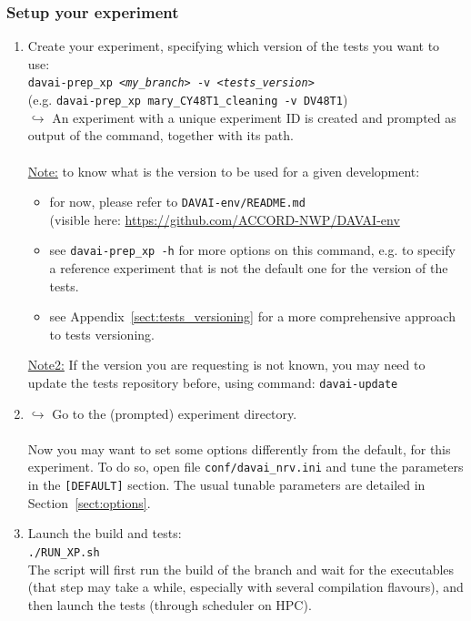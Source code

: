 \documentclass[a4paper,10pt,twoside]{article}
\begin{document}
\subsubsection{Setup your experiment}
\begin{enumerate}[label=(\alph*)]
 \item Create your experiment, specifying which version of the tests you want to use:\\
 \texttt{davai-prep\_xp \textit{<my\_branch>} -v \textit{<tests\_version>}}\\
 (e.g. \texttt{davai-prep\_xp mary\_CY48T1\_cleaning -v DV48T1})\\
 $\hookrightarrow$ An experiment with a unique experiment ID is created and prompted as output of the command, together with its path.\\
 \\
 \underline{Note:} to know what is the version to be used for a given development:
 \begin{itemize}
  \item for now, please refer to \texttt{DAVAI-env/README.md}\\
        (visible here: \href{https://github.com/ACCORD-NWP/DAVAI-env}{https://github.com/ACCORD-NWP/DAVAI-env}
  \item see \texttt{davai-prep\_xp -h} for more options on this command, e.g. to specify a reference experiment that is not the default one for the version of the tests.
  \item see Appendix~\ref{sect:tests_versioning} for a more comprehensive approach to tests versioning.
 \end{itemize}
 \underline{Note2:} If the version you are requesting is not known, you may need to update the tests repository before, using command: \texttt{davai-update}
 \item $\hookrightarrow$ Go to the (prompted) experiment directory.\\
 \\
 Now you may want to set some options differently from the default, for this experiment. To do so, open file \texttt{conf/davai\_nrv.ini} and tune the parameters in the \texttt{[DEFAULT]} section. The usual tunable parameters are detailed in Section~\ref{sect:options}.
 \item Launch the build and tests:\\
 \texttt{./RUN\_XP.sh}\\
 The script will first run the build of the branch and wait for the executables (that step may take a while, especially with several compilation flavours), and then launch the tests (through scheduler on HPC).
\end{enumerate}
\end{document}
